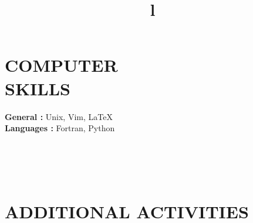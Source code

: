 \documentclass[margin]{res}
\begin{document}
\begin{resume}
\section{COMPUTER\\SKILLS}

\textbf{General : } Unix, Vim, \LaTeX
\\
\textbf{Languages : } Fortran, Python

\begin{format}
\title{l}\\
\\
\body\\
\end{format}

\section{ADDITIONAL ACTIVITIES}




\end{resume}
\(\)
\end{document}
